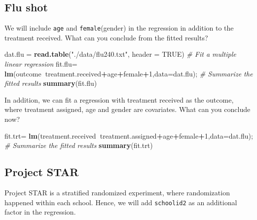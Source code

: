 \documentclass[12pt,]{book}
\newenvironment{Shaded}{\begin{snugshade}}{\end{snugshade}}
\newcommand{\KeywordTok}[1]{\textcolor[rgb]{0.13,0.29,0.53}{\textbf{#1}}}
\newcommand{\DataTypeTok}[1]{\textcolor[rgb]{0.13,0.29,0.53}{#1}}
\newcommand{\DecValTok}[1]{\textcolor[rgb]{0.00,0.00,0.81}{#1}}
\newcommand{\StringTok}[1]{\textcolor[rgb]{0.31,0.60,0.02}{#1}}
\newcommand{\CommentTok}[1]{\textcolor[rgb]{0.56,0.35,0.01}{\textit{#1}}}
\newcommand{\OtherTok}[1]{\textcolor[rgb]{0.56,0.35,0.01}{#1}}
\newcommand{\OperatorTok}[1]{\textcolor[rgb]{0.81,0.36,0.00}{\textbf{#1}}}
\newcommand{\NormalTok}[1]{#1}
\begin{document}
\subsection{Flu shot}\label{flu-shot-1}

We will include \texttt{age} and \texttt{female}(gender) in the
regression in addition to the treatment received. What can you conclude
from the fitted results?

\begin{Shaded}
\begin{Highlighting}[]
\NormalTok{dat.flu =}\StringTok{ }\KeywordTok{read.table}\NormalTok{(}\StringTok{"./data/flu240.txt"}\NormalTok{, }\DataTypeTok{header =} \OtherTok{TRUE}\NormalTok{)}
\CommentTok{# Fit a multiple linear regression}
\NormalTok{fit.flu=}\StringTok{ }\KeywordTok{lm}\NormalTok{(outcome}\OperatorTok{~}\NormalTok{treatment.received}\OperatorTok{+}\NormalTok{age}\OperatorTok{+}\NormalTok{female}\OperatorTok{+}\DecValTok{1}\NormalTok{,}\DataTypeTok{data=}\NormalTok{dat.flu); }
\CommentTok{# Summarize the fitted results}
\KeywordTok{summary}\NormalTok{(fit.flu) }
\end{Highlighting}
\end{Shaded}

In addition, we can fit a regression with treatment received as the
outcome, where treatment assigned, age and gender are covariates. What
can you conclude now?

\begin{Shaded}
\begin{Highlighting}[]
\NormalTok{fit.trt=}\StringTok{ }\KeywordTok{lm}\NormalTok{(treatment.received}\OperatorTok{~}\NormalTok{treatment.assigned}\OperatorTok{+}\NormalTok{age}\OperatorTok{+}\NormalTok{female}\OperatorTok{+}\DecValTok{1}\NormalTok{,}\DataTypeTok{data=}\NormalTok{dat.flu); }
\CommentTok{# Summarize the fitted results}
\KeywordTok{summary}\NormalTok{(fit.trt) }
\end{Highlighting}
\end{Shaded}

\subsection{Project STAR}\label{project-star-1}

Project STAR is a stratified randomized experiment, where randomization
happened within each school. Hence, we will add \texttt{schoolid2} as an
additional factor in the regression.
\end{document}
